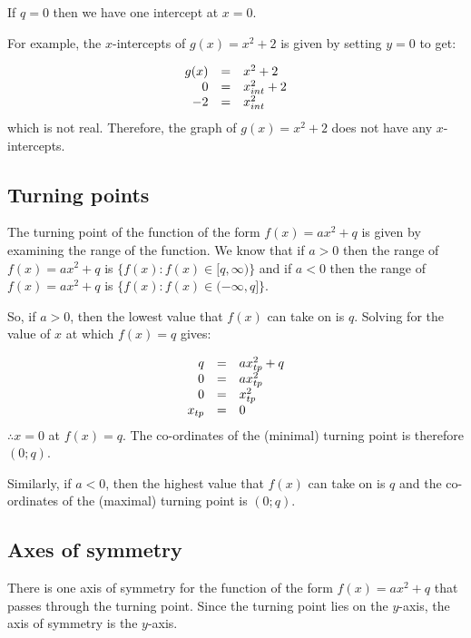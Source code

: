 If $q=0$ then we have one intercept at $x=0$.\par 
For example, the $x$-intercepts of $g(x)={x}^{2}+2$ is given by setting $y=0$ to get:\par 
\nopagebreak\noindent{}
\begin{equation*}
\begin{array}{ccc}\hfill g(x)& =& {x}^{2}+2\hfill \\ \hfill 0& =& x_{int}^{2}+2\hfill \\ \hfill -2& =& x_{int}^{2}\hfill \end{array}
\end{equation*}
which is not real. Therefore, the graph of $g(x)={x}^{2}+2$ does not have any $x$-intercepts.\par 

\subsection*{Turning points}
\nopagebreak
The turning point of the function of the form $f(x)=a{x}^{2}+q$ is given by examining the range of the function. We know that if $a>0$ then the range of $f(x)=a{x}^{2}+q$ is $\{f(x):f(x)\in [q,\infty )\}$ and if $a<0$ then the range of $f(x)=a{x}^{2}+q$ is $\{f(x):f(x)\in (-\infty ,q]\}$.\par 
So, if $a>0$, then the lowest value that $f(x)$ can take on is $q$. Solving for the value of $x$ at which $f(x)=q$ gives:\par 
\nopagebreak\noindent{}
\begin{equation*}
\begin{array}{ccc}\hfill q& =& ax_{tp}^{2}+q\hfill \\ \hfill 0& =& ax_{tp}^{2}\hfill \\ \hfill 0& =& x_{tp}^{2}\hfill \\ \hfill {x}_{tp}& =& 0\hfill \end{array}
\end{equation*}
$\therefore x=0$ at $f(x)=q$. The co-ordinates of the (minimal) turning point is therefore $(0;q)$.\par 
Similarly, if $a<0$, then the highest value that $f(x)$ can take on is $q$ and the co-ordinates of the (maximal) turning point is $(0;q)$.\par 

\subsection*{Axes of symmetry}
\nopagebreak
There is one axis of symmetry for the function of the form $f(x)=a{x}^{2}+q$ that passes through the turning point. Since the turning point lies on the $y$-axis, the axis of symmetry is the $y$-axis.\par 


